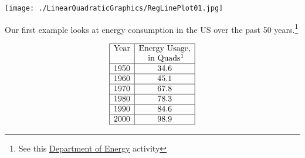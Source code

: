 \begin{center}  

\texttt{[image: ./LinearQuadraticGraphics/RegLinePlot01.jpg]}

\end{center}

Our first example looks at energy consumption in the US over the past 50 years.\footnote{See this \href{http://www.eia.doe.gov/kids/classactivities/EnergyAnalysisEIA.pdf}{\underline{Department of Energy}} activity}

\[\begin{array}{|c|c|} \hline
\mbox{Year} & \mbox{Energy Usage,} \\
& \mbox{ in Quads\footnotemark} \\ \hline
1950 & 34.6 \\ \hline
1960 & 45.1 \\ \hline
1970 & 67.8 \\ \hline
1980 & 78.3 \\ \hline
1990 & 84.6 \\ \hline
2000 & 98.9 \\ \hline

\end{array}\]

